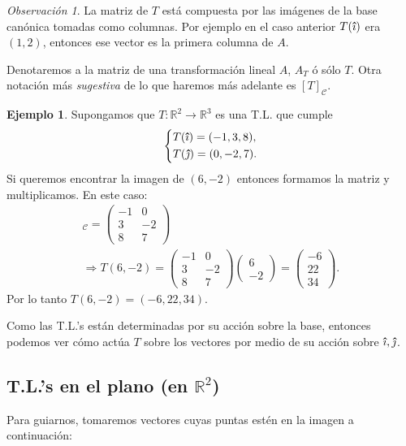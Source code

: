 \documentclass[12pt]{article}
\theoremstyle{plain}
\theoremstyle{definition}
\newtheorem{Ex}[Th]{Ejemplo}           %
\theoremstyle{remark}
\newtheorem*{Rmk}{Observación}      %
\newcommand{\ii}{\vu{\imath}}
\newcommand{\jj}{\vu{\jmath}}
\newcommand{\bR}{\mathbb{R}}        %
\newcommand{\cC}{\mathcal{C}}       %
\renewcommand{\:}{\colon}           %
\renewcommand{\.}{\Cdot}                %
\newcommand{\twobyone}[2]{\begin{pmatrix} %
  #1 \\ #2 \end{pmatrix}}
\newcommand{\threebyone}[3]{\begin{pmatrix} %
  #1 \\ #2 \\ #3 \end{pmatrix}}
\newcommand{\threebytwo}[6]{\begin{pmatrix} %
    #1 & #2\\ #3 & #4\\ #5&#6 \end{pmatrix}}
\newcommand{\To}{\Rightarrow}
\begin{document}
\begin{multicols}{2}
\begin{Rmk}
    La matriz de $T$ está compuesta por las imágenes de la base canónica tomadas como columnas. Por ejemplo en el caso anterior $T(\ii)$ era $(1,2)$, entonces ese vector es la primera columna de $A$.
\end{Rmk}

Denotaremos a la matriz de una transformación lineal $A$, $A_T$ ó sólo $T$. Otra notación más \emph{sugestiva} de lo que haremos más adelante es $[T]_\cC$.
\begin{Ex}
    Supongamos que $T:\bR^2\to\bR^3$ es una T.L. que cumple 
    $$
    \left\lbrace
    \begin{aligned}
        &T(\ii)=(-1,3,8),\\
        &T(\jj)=(0,-2,7).\\
    \end{aligned}
    \right.
    $$
    Si queremos encontrar la imagen de $(6,-2)$ entonces formamos la matriz y multiplicamos. En este caso:
    \begin{gather*}
        [T]_\cC=\threebytwo{-1}{0}{3}{-2}{8}{7}\\
        \To T(6,-2)=\threebytwo{-1}{0}{3}{-2}{8}{7}\twobyone{6}{-2}=\threebyone{-6}{22}{34}.
    \end{gather*}
    Por lo tanto $T(6,-2)=(-6,22,34)$.
\end{Ex}
Como las T.L.'s están determinadas por su acción sobre la base, entonces podemos ver cómo actúa $T$ sobre los vectores por medio de su acción sobre $\ii,\jj$.
\subsection*{T.L.'s en el plano (en $\bR^2$)}
Para guiarnos, tomaremos vectores cuyas puntas estén en la imagen a continuación:
\begin{multicols*}{2}
    \begin{minipage}{0.2\textwidth}
            

\begin{tikzpicture}[x=0.75pt,y=0.75pt,yscale=-1,xscale=1]


\end{tikzpicture}
\end{minipage}
\end{multicols*}
\end{multicols}
\end{document}
